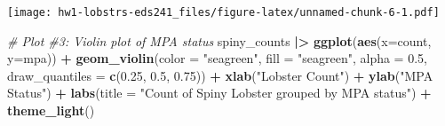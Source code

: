 \documentclass[
]{article}
\newenvironment{Shaded}{\begin{snugshade}}{\end{snugshade}}
\newcommand{\AttributeTok}[1]{\textcolor[rgb]{0.13,0.29,0.53}{#1}}
\newcommand{\CommentTok}[1]{\textcolor[rgb]{0.56,0.35,0.01}{\textit{#1}}}
\newcommand{\DecValTok}[1]{\textcolor[rgb]{0.00,0.00,0.81}{#1}}
\newcommand{\FloatTok}[1]{\textcolor[rgb]{0.00,0.00,0.81}{#1}}
\newcommand{\FunctionTok}[1]{\textcolor[rgb]{0.13,0.29,0.53}{\textbf{#1}}}
\newcommand{\NormalTok}[1]{#1}
\newcommand{\OtherTok}[1]{\textcolor[rgb]{0.56,0.35,0.01}{#1}}
\newcommand{\SpecialCharTok}[1]{\textcolor[rgb]{0.81,0.36,0.00}{\textbf{#1}}}
\newcommand{\StringTok}[1]{\textcolor[rgb]{0.31,0.60,0.02}{#1}}
\begin{document}
\begin{Shaded}
\end{Shaded}

\texttt{[image: hw1-lobstrs-eds241\_files/figure-latex/unnamed-chunk-6-1.pdf]}

\begin{Shaded}
\begin{Highlighting}[]
\CommentTok{\# Plot \#3: Violin plot of MPA status}
\NormalTok{spiny\_counts }\SpecialCharTok{|\textgreater{}}
    \FunctionTok{ggplot}\NormalTok{(}\FunctionTok{aes}\NormalTok{(}\AttributeTok{x=}\NormalTok{count, }\AttributeTok{y=}\NormalTok{mpa)) }\SpecialCharTok{+}
    \FunctionTok{geom\_violin}\NormalTok{(}\AttributeTok{color =} \StringTok{"seagreen"}\NormalTok{, }\AttributeTok{fill =} \StringTok{"seagreen"}\NormalTok{, }\AttributeTok{alpha =} \FloatTok{0.5}\NormalTok{, }\AttributeTok{draw\_quantiles =} \FunctionTok{c}\NormalTok{(}\FloatTok{0.25}\NormalTok{, }\FloatTok{0.5}\NormalTok{, }\FloatTok{0.75}\NormalTok{)) }\SpecialCharTok{+}
    \FunctionTok{xlab}\NormalTok{(}\StringTok{"Lobster Count"}\NormalTok{) }\SpecialCharTok{+}
    \FunctionTok{ylab}\NormalTok{(}\StringTok{"MPA Status"}\NormalTok{) }\SpecialCharTok{+}
    \FunctionTok{labs}\NormalTok{(}\AttributeTok{title =} \StringTok{"Count of Spiny Lobster grouped by MPA status"}\NormalTok{) }\SpecialCharTok{+}
    \FunctionTok{theme\_light}\NormalTok{()}
\end{Highlighting}
\end{Shaded}
\end{document}
